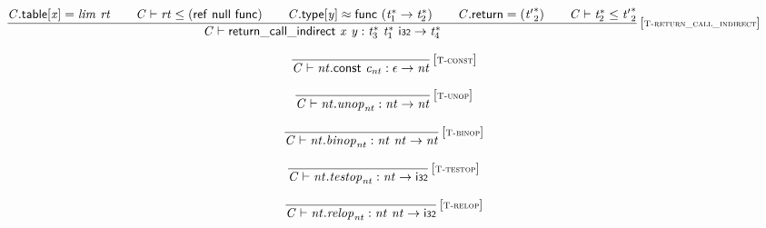 $$
\begin{array}{@{}c@{}}\displaystyle
\frac{
{\mathit{C}}.\mathsf{table}[{\mathit{x}}] = {\mathit{lim}}~{\mathit{rt}}
 \qquad
{\mathit{C}} \vdash {\mathit{rt}} \leq (\mathsf{ref}~\mathsf{null}~\mathsf{func})
 \qquad
{\mathit{C}}.\mathsf{type}[{\mathit{y}}] \approx \mathsf{func}~({{\mathit{t}}_{{1}}^\ast} \rightarrow {{\mathit{t}}_{{2}}^\ast})
 \qquad
{\mathit{C}}.\mathsf{return} = ({{\mathit{t}'}_{{2}}^\ast})
 \qquad
{\mathit{C}} \vdash {{\mathit{t}}_{{2}}^\ast} \leq {{\mathit{t}'}_{{2}}^\ast}
}{
{\mathit{C}} \vdash \mathsf{return\_call\_indirect}~{\mathit{x}}~{\mathit{y}} : {{\mathit{t}}_{{3}}^\ast}~{{\mathit{t}}_{{1}}^\ast}~\mathsf{i{\scriptstyle32}} \rightarrow {{\mathit{t}}_{{4}}^\ast}
} \, {[\textsc{\scriptsize T{-}return\_call\_indirect}]}
\qquad
\end{array}
$$

\vspace{1ex}

$$
\begin{array}{@{}c@{}}\displaystyle
\frac{
}{
{\mathit{C}} \vdash {\mathit{nt}}.\mathsf{const}~{\mathit{c}}_{{\mathit{nt}}} : \epsilon \rightarrow {\mathit{nt}}
} \, {[\textsc{\scriptsize T{-}const}]}
\qquad
\end{array}
$$

$$
\begin{array}{@{}c@{}}\displaystyle
\frac{
}{
{\mathit{C}} \vdash {\mathit{nt}} . {\mathit{unop}}_{{\mathit{nt}}} : {\mathit{nt}} \rightarrow {\mathit{nt}}
} \, {[\textsc{\scriptsize T{-}unop}]}
\qquad
\end{array}
$$

$$
\begin{array}{@{}c@{}}\displaystyle
\frac{
}{
{\mathit{C}} \vdash {\mathit{nt}} . {\mathit{binop}}_{{\mathit{nt}}} : {\mathit{nt}}~{\mathit{nt}} \rightarrow {\mathit{nt}}
} \, {[\textsc{\scriptsize T{-}binop}]}
\qquad
\end{array}
$$

$$
\begin{array}{@{}c@{}}\displaystyle
\frac{
}{
{\mathit{C}} \vdash {\mathit{nt}} . {\mathit{testop}}_{{\mathit{nt}}} : {\mathit{nt}} \rightarrow \mathsf{i{\scriptstyle32}}
} \, {[\textsc{\scriptsize T{-}testop}]}
\qquad
\end{array}
$$

$$
\begin{array}{@{}c@{}}\displaystyle
\frac{
}{
{\mathit{C}} \vdash {\mathit{nt}} . {\mathit{relop}}_{{\mathit{nt}}} : {\mathit{nt}}~{\mathit{nt}} \rightarrow \mathsf{i{\scriptstyle32}}
} \, {[\textsc{\scriptsize T{-}relop}]}
\qquad
\end{array}
$$

